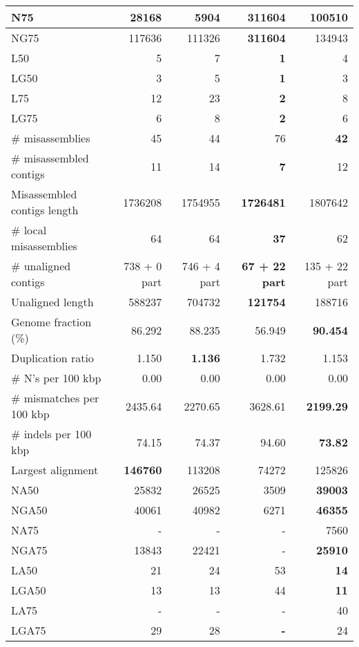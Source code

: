 \documentclass[12pt,a4paper]{article}
\begin{document}
\begin{table}[ht]
\begin{center}
\begin{tabular}{|l*{4}{|r}|}
N75 & 28168 & 5904 & {\bf 311604} & 100510 \\ \hline
NG75 & 117636 & 111326 & {\bf 311604} & 134943 \\ \hline
L50 & 5 & 7 & {\bf 1} & 4 \\ \hline
LG50 & 3 & 5 & {\bf 1} & 3 \\ \hline
L75 & 12 & 23 & {\bf 2} & 8 \\ \hline
LG75 & 6 & 8 & {\bf 2} & 6 \\ \hline
\# misassemblies & 45 & 44 & 76 & {\bf 42} \\ \hline
\# misassembled contigs & 11 & 14 & {\bf 7} & 12 \\ \hline
Misassembled contigs length & 1736208 & 1754955 & {\bf 1726481} & 1807642 \\ \hline
\# local misassemblies & 64 & 64 & {\bf 37} & 62 \\ \hline
\# unaligned contigs & 738 + 0 part & 746 + 4 part & {\bf 67 + 22 part} & 135 + 22 part \\ \hline
Unaligned length & 588237 & 704732 & {\bf 121754} & 188716 \\ \hline
Genome fraction (\%) & 86.292 & 88.235 & 56.949 & {\bf 90.454} \\ \hline
Duplication ratio & 1.150 & {\bf 1.136} & 1.732 & 1.153 \\ \hline
\# N's per 100 kbp & 0.00 & 0.00 & 0.00 & 0.00 \\ \hline
\# mismatches per 100 kbp & 2435.64 & 2270.65 & 3628.61 & {\bf 2199.29} \\ \hline
\# indels per 100 kbp & 74.15 & 74.37 & 94.60 & {\bf 73.82} \\ \hline
Largest alignment & {\bf 146760} & 113208 & 74272 & 125826 \\ \hline
NA50 & 25832 & 26525 & 3509 & {\bf 39003} \\ \hline
NGA50 & 40061 & 40982 & 6271 & {\bf 46355} \\ \hline
NA75 & - & - & - & 7560 \\ \hline
NGA75 & 13843 & 22421 & - & {\bf 25910} \\ \hline
LA50 & 21 & 24 & 53 & {\bf 14} \\ \hline
LGA50 & 13 & 13 & 44 & {\bf 11} \\ \hline
LA75 & - & - & - & 40 \\ \hline
LGA75 & 29 & 28 & {\bf -} & 24 \\ \hline
\end{tabular}
\end{center}
\end{table}
\end{document}

